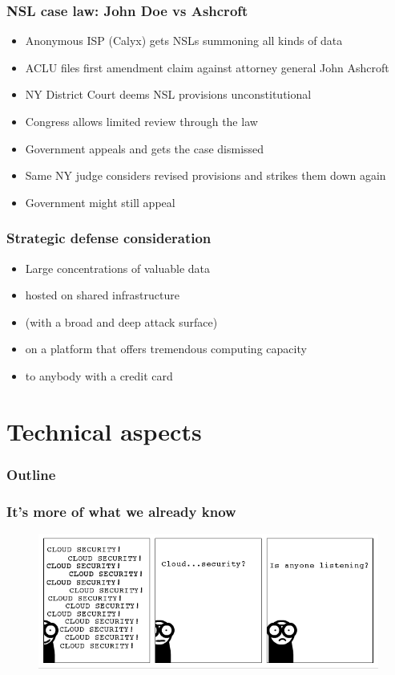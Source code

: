 \documentclass{beamer}
\begin{document}
\begin{frame}
    \frametitle{NSL case law: John Doe vs Ashcroft}
    \begin{itemize}
    \item Anonymous ISP (Calyx) gets NSLs summoning all kinds of data
    \item ACLU files first amendment claim against attorney general John Ashcroft
    \item NY District Court deems NSL provisions unconstitutional
    \item Congress allows limited review through the law
    \item Government appeals and gets the case dismissed
    \item Same NY judge considers revised provisions and strikes them down again
    \item Government might still appeal
    \end{itemize}
\end{frame}

\begin{frame}
    \frametitle{Strategic defense consideration}
    \begin{itemize}
      \item Large concentrations of valuable data
      \item hosted on shared infrastructure
      \item (with a broad and deep attack surface)
      \item on a platform that offers tremendous computing capacity
      \item to anybody with a credit card
    \end{itemize}
\end{frame}

\section{Technical aspects}

\begin{frame}
  \frametitle{Outline}
\end{frame}

\begin{frame}
    \frametitle{It's more of what we already know}
    \begin{figure}
        \includegraphics[width=\textwidth]{../img/infosuck_org_0x0062.png}
        \label{fig:infosuck}
    \end{figure}
\end{frame}
\end{document}
